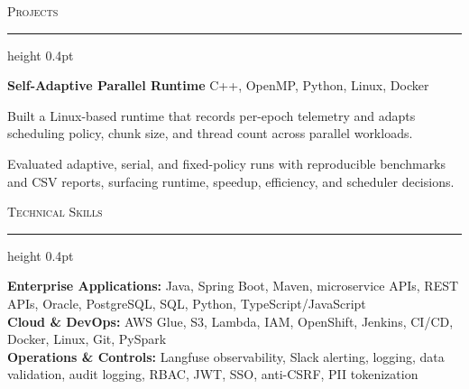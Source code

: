 \documentclass[letterpaper,11pt]{article}
\newcommand{\resumesection}[1]{%
  \par\vspace{2pt}%
  {\large\scshape #1}\par\vspace{2pt}%
  \hrule height 0.4pt\vspace{2pt}%
}
\newcommand{\projectHeading}[2]{
  \textbf{#1} \hfill #2
}
\begin{document}
\resumesection{Projects}
\projectHeading{Self-Adaptive Parallel Runtime}{C++, OpenMP, Python, Linux, Docker}
\begin{tightitemize}
  \item Built a Linux-based runtime that records per-epoch telemetry and adapts scheduling policy, chunk size, and thread count across parallel workloads.
  \item Evaluated adaptive, serial, and fixed-policy runs with reproducible benchmarks and CSV reports, surfacing runtime, speedup, efficiency, and scheduler decisions.
\end{tightitemize}

\resumesection{Technical Skills}
\textbf{Enterprise Applications:} Java, Spring Boot, Maven, microservice APIs, REST APIs, Oracle, PostgreSQL, SQL, Python, TypeScript/JavaScript\\
\textbf{Cloud \& DevOps:} AWS Glue, S3, Lambda, IAM, OpenShift, Jenkins, CI/CD, Docker, Linux, Git, PySpark\\
\textbf{Operations \& Controls:} Langfuse observability, Slack alerting, logging, data validation, audit logging, RBAC, JWT, SSO, anti-CSRF, PII tokenization
\end{document}
